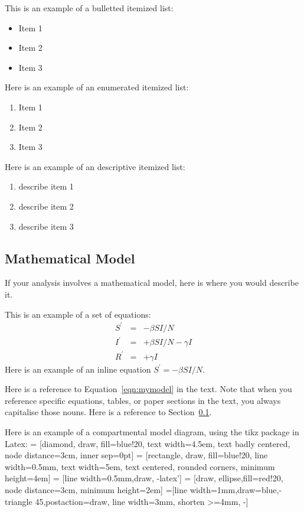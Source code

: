 \documentclass[12pt]{article}
\begin{document}
This is an example of a bulletted itemized list:
\begin{itemize}
\item Item 1
\item Item 2
\item Item 3
\end{itemize}

Here is an example of an enumerated itemized list:
\begin{enumerate}
\item Item 1
\item Item 2
\item Item 3
\end{enumerate}

Here is an example of an descriptive itemized list:
\begin{enumerate}
\item[Item 1:] describe item 1
\item[Item 2:] describe item 2
\item[Item 3:] describe item 3
\end{enumerate}


\subsection{Mathematical Model}
\label{sec:math_model}

If your analysis involves a mathematical model, here is where you would describe it.

This is an example of a set of equations:
\begin{eqnarray}
S^\prime & = & -\beta S I/N \nonumber \\
I^\prime & = & +\beta S I/N -\gamma I\nonumber \\
R^\prime & = & +\gamma I
\label{eqn:mymodel}
\end{eqnarray}
Here is an example of an inline equation $S^\prime = -\beta S I/N$.

Here is a reference to Equation~\ref{eqn:mymodel} in the text.  Note that when you
reference specific equations, tables, or paper sections in the text, you always 
capitalise those nouns.  Here is a reference to Section~\ref{sec:math_model}.


Here is an example of a compartmental model diagram, using the tikz package in 
Latex:
 = [diamond, draw, fill=blue!20,
    text width=4.5em, text badly centered, node distance=3cm, inner sep=0pt]
 = [rectangle, draw, fill=blue!20, line width=0.5mm,
    text width=5em, text centered, rounded corners, minimum height=4em]
 = [line width=0.5mm,draw, -latex']
 = [draw, ellipse,fill=red!20, node distance=3cm,
    minimum height=2em]
=[line width=1mm,draw=blue,-triangle 45,postaction={draw, line width=3mm, shorten >=4mm, -}]
\end{document}
